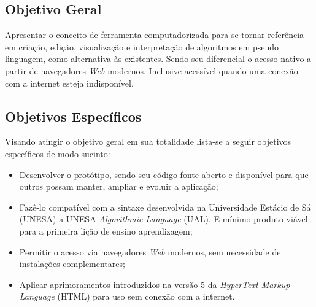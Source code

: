 \ifdraft{\color{green}}{}\subsection{Objetivo Geral}

Apresentar o conceito de ferramenta computadorizada para se tornar referência
em criação, edição, visualização e interpretação de algoritmos em
pseudo linguagem, como alternativa às existentes. Sendo seu diferencial o acesso
nativo a partir de navegadores \textit{Web} modernos. Inclusive acessível
quando uma conexão com a internet esteja indisponível.

\subsection{Objetivos Específicos}

Visando atingir o objetivo geral em sua totalidade lista-se a seguir objetivos
específicos de modo sucinto:

\begin{itemize}
\setlength\itemsep{0em}

\item Desenvolver o protótipo, sendo seu código fonte aberto e
disponível para que outros possam manter, ampliar e evoluir a aplicação;

\item Fazê-lo compatível com a sintaxe desenvolvida na Universidade Estácio
de Sá (UNESA) a UNESA \textit{Algorithmic Language} (UAL). E mínimo produto
viável para a primeira lição de ensino aprendizagem;

\item Permitir o acesso via navegadores \textit{Web} modernos, sem
necessidade de instalações complementares;


\item Aplicar aprimoramentos introduzidos na versão 5 da
\textit{HyperText Markup Language} (HTML) para uso sem conexão com a
internet.

\end{itemize}\color{black}
